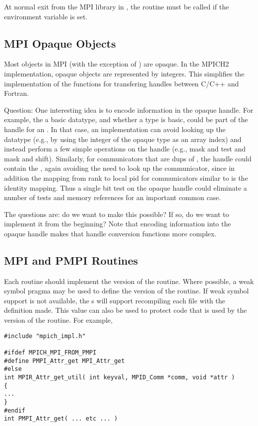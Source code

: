 \documentclass{article}
\begin{document}
At normal exit from the MPI library in , the
routine  must be called if the environment variable
 is set.  

\subsection{MPI Opaque Objects}

Most objects in MPI (with the exception of ) are
opaque.  In the MPICH2 implementation, opaque objects are represented
by integers.  This simplifies the implementation of the functions for
transfering handles between C/C++ and Fortran.  

Question:  One interesting idea is to encode information in the opaque
handle.  For example, the  a basic datatype, and whether
a type is basic, could be part of the handle for an
. In that case, an implementation can avoid looking
up the datatype (e.g., by using the integer of the opaque type as an
array index) and instead perform a few simple operations on the handle
(e.g., mask and test and mask and shift).  Similarly, for
communicators that are dups of , the handle could
contain the , again avoiding the need to look up the
communicator, since in addition the mapping from rank to local pid for 
communicators similar to  is the identity
mapping.  Thus a single bit test on the opaque handle could eliminate
a number of tests and memory references for an important common case.

The questions are: do we want to make this possible?  If so, do we
want to implement it from the beginning?  Note that encoding
information into the opaque handle makes that handle conversion
functions more complex.

\subsection{MPI and PMPI Routines}
Each routine should implement the  version of the routine.
Where possible, a weak symbol pragma may be used to define the
 version of the routine.  If weak symbol support is not
available, the s will support recompiling each file
with the definition  made.  This value
can also be used to protect code that is used by the 
version of the routine.  For example, 
\begin{verbatim}
#include "mpich_impl.h"

#ifdef MPICH_MPI_FROM_PMPI
#define PMPI_Attr_get MPI_Attr_get
#else
int MPIR_Attr_get_util( int keyval, MPID_Comm *comm, void *attr )
{
...
}
#endif
int PMPI_Attr_get( ... etc ... )
\end{verbatim}
\end{document}
